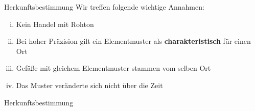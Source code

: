 \documentclass[xcolor=dvipsnames, aspectratio=169]{beamer}
\begin{document}
\begin{frame}{Herkunftsbestimmung}
Wir treffen folgende wichtige Annahmen:
\begin{enumerate}[(i)]
\item Kein Handel mit Rohton
\item Bei hoher Präzision gilt ein Elementmuster als \textbf{charakteristisch} für einen Ort
\item Gefäße mit gleichem Elementmuster stammen vom selben Ort
\item Das Muster veränderte sich nicht über die Zeit
\end{enumerate}
\end{frame}

\begin{frame}{Herkunftsbestimmung}
\begin{center}\Large
\begin{tabularx}{.9\columnwidth}{rlCrl}

\end{tabularx}
\end{center}
\end{frame}
\end{document}

